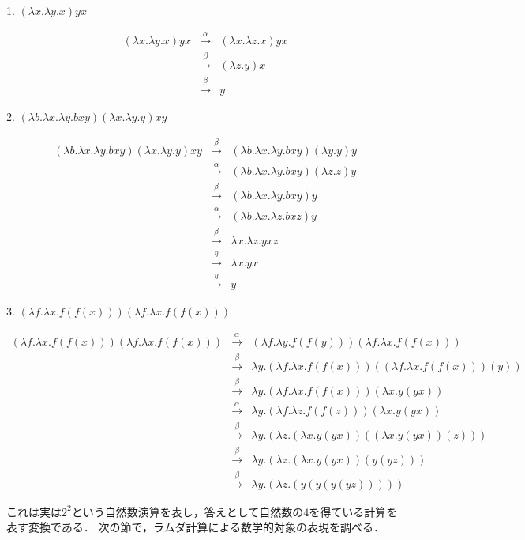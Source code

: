 \documentclass[uplatex, 12pt, dvipdfmx]{jsreport}
\begin{document}
\begin{example}
    1. $(\lambda x.\lambda y.x)yx$

    \begin{eqnarray*}
        (\lambda x.\lambda y.x)yx &\xrightarrow{\alpha}& (\lambda x.\lambda z.x)yx \\
        &\xrightarrow{\beta}& (\lambda z.y)x \\
        &\xrightarrow{\beta}& y
    \end{eqnarray*}

    2. $(\lambda b.\lambda x.\lambda y.bxy)(\lambda x.\lambda y.y)xy$

    \begin{eqnarray*}
        (\lambda b.\lambda x.\lambda y.bxy)(\lambda x.\lambda y.y)xy &\xrightarrow{\beta}& (\lambda b.\lambda x.\lambda y.bxy)(\lambda y.y)y \\
        &\xrightarrow{\alpha}& (\lambda b.\lambda x.\lambda y.bxy)(\lambda z.z)y \\
        &\xrightarrow{\beta}& (\lambda b.\lambda x.\lambda y.bxy)y \\
        &\xrightarrow{\alpha}& (\lambda b.\lambda x.\lambda z.bxz)y \\
        &\xrightarrow{\beta}& \lambda x.\lambda z.yxz \\
        &\xrightarrow{\eta}& \lambda x.yx \\
        &\xrightarrow{\eta}& y
    \end{eqnarray*}

    3. $(\lambda f.\lambda x.f(f(x)))(\lambda f.\lambda x.f(f(x)))$

    \begin{eqnarray*}
        (\lambda f.\lambda x.f(f(x)))(\lambda f.\lambda x.f(f(x))) &\xrightarrow{\alpha}& (\lambda f.\lambda y.f(f(y)))(\lambda f.\lambda x.f(f(x))) \\
        &\xrightarrow{\beta}& \lambda y.(\lambda f.\lambda x.f(f(x)))((\lambda f.\lambda x.f(f(x)))(y)) \\
        &\xrightarrow{\beta}& \lambda y.(\lambda f.\lambda x.f(f(x)))(\lambda x.y(yx)) \\
        &\xrightarrow{\alpha}& \lambda y.(\lambda f.\lambda z.f(f(z)))(\lambda x.y(yx)) \\
        &\xrightarrow{\beta}& \lambda y.(\lambda z.(\lambda x.y(yx))((\lambda x.y(yx))(z))) \\
        &\xrightarrow{\beta}& \lambda y.(\lambda z.(\lambda x.y(yx))(y(yz))) \\
        &\xrightarrow{\beta}& \lambda y.(\lambda z.(y(y(y(yz)))))
    \end{eqnarray*}

    これは実は$2^2$という自然数演算を表し，答えとして自然数の$4$を得ている計算を表す変換である．
    次の節で，ラムダ計算による数学的対象の表現を調べる．
\end{example}
\end{document}
